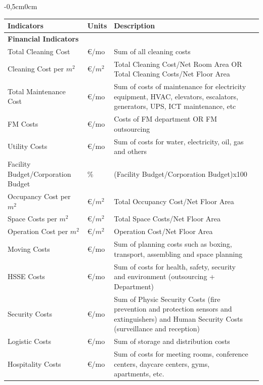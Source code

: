 \begin{table}[h!]
	\vspace{-1cm}
	\begin{adjustwidth}{-0,5cm}{0cm} 
	\resizebox{13cm}{!} {
	\begin{tabular}{llp{8cm}l}
		\hline
		 {\bf Indicators} &  {\bf Units} & {\bf Description} \\
		\hline
		{\bf Financial Indicators} & & \\
		Total Cleaning Cost 				& \euro/mo &  Sum of all cleaning costs \\
		Cleaning Cost per $m^2$ 			& \euro/$m^2$ &  Total Cleaning Cost/Net Room Area OR Total Cleaning Costs/Net Floor Area\\
		Total Maintenance Cost 				& \euro/mo &  Sum of costs of maintenance for electricity equipment, HVAC, elevators, escalators, generators, UPS, ICT maintenance, etc\\  
		FM Costs 							& \euro/mo &  Costs of FM department OR FM outsourcing \\ 
		Utility Costs 						& \euro/mo  & Sum of costs for water, electricity, oil, gas and others \\ 
		Facility Budget/Corporation Budget 	& \% & (Facility Budget/Corporation Budget)x100 \\ 
		Occupancy Cost per $m^2$ 			& \euro/$m^2$ & Total Occupancy Cost/Net Floor Area \\ 
		Space Costs per $m^2$ 				& \euro/$m^2$ & Total Space Costs/Net Floor Area\\ 
		Operation Cost per $m^2$ 			& \euro/$m^2$ & Operation Cost/Net Floor Area\\
		Moving Costs 						& \euro/mo & Sum of planning costs such as boxing, transport, assembling and space planning\\
		HSSE Costs 							& \euro/mo & Sum of costs for health, safety, security and environment (outsourcing + Department) \\ 
		Security Costs 						& \euro/mo & Sum of Physic Security Costs (fire prevention and protection sensors and extinguishers) and Human Security Costs (surveillance and reception)\\ 
		Logistic Costs 						& \euro/mo & Sum of storage and distribution costs\\ 
		Hospitality Costs 					& \euro/mo & Sum of costs for meeting rooms, conference centers, daycare centers, gyms, apartments, etc.\\ 

\end{tabular}}
\end{adjustwidth}
\end{table}
